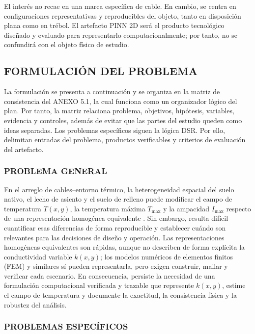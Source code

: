 \documentclass[11pt,a4paper,oneside]{report}
\newcommand{\Tmax}{T_{\max}}
\newcommand{\Imax}{I_{\max}}
\newcommand{\kx}{k(x,y)}
\begin{document}
El interés no recae en una marca específica de cable. En cambio, se centra en configuraciones representativas y reproducibles del objeto, tanto en disposición plana como en trébol. El artefacto PINN 2D será el producto tecnológico diseñado y evaluado para representarlo computacionalmente; por tanto, no se confundirá con el objeto físico de estudio.

\subsection{FORMULACIÓN DEL PROBLEMA}

La formulación se presenta a continuación y se organiza en la matriz de consistencia del ANEXO 5.1, la cual funciona como un organizador lógico del plan. Por tanto, la matriz relaciona problema, objetivos, hipótesis, variables, evidencia y controles, además de evitar que las partes del estudio queden como ideas separadas. Los problemas específicos siguen la lógica DSR. Por ello, delimitan entradas del problema, productos verificables y criterios de evaluación del artefacto.

\subsubsection{PROBLEMA GENERAL}

En el arreglo de cables--entorno térmico, la heterogeneidad espacial del suelo nativo, el lecho de asiento y el suelo de relleno puede modificar el campo de temperatura $T(x,y)$, la temperatura máxima $\Tmax$ y la ampacidad $\Imax$ respecto de una representación homogénea equivalente \parencites[4--6]{enescu2021}[3--4,93--99]{cigre2025}. Sin embargo, resulta difícil cuantificar esas diferencias de forma reproducible y establecer cuándo son relevantes para las decisiones de diseño y operación. Las representaciones homogéneas equivalentes son rápidas, aunque no describen de forma explícita la conductividad variable $\kx$; los modelos numéricos de elementos finitos (FEM) y similares sí pueden representarla, pero exigen construir, mallar y verificar cada escenario. En consecuencia, persiste la necesidad de una formulación computacional verificada y trazable que represente $\kx$, estime el campo de temperatura y documente la exactitud, la consistencia física y la robustez del análisis.

\subsubsection{PROBLEMAS ESPECÍFICOS}
\end{document}
